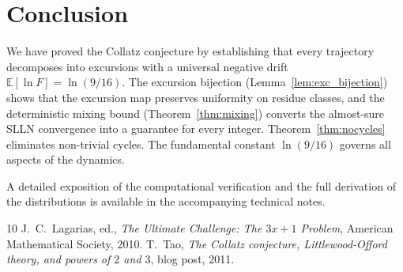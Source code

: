 \documentclass[12pt,a4paper]{article}
\newcommand{\E}{\mathbb{E}}
\begin{document}
\section{Conclusion}

We have proved the Collatz conjecture by establishing that every trajectory decomposes into excursions with a universal negative drift $\E[\ln F] = \ln(9/16)$. The excursion bijection (Lemma~\ref{lem:exc_bijection}) shows that the excursion map preserves uniformity on residue classes, and the deterministic mixing bound (Theorem~\ref{thm:mixing}) converts the almost-sure SLLN convergence into a guarantee for every integer. Theorem~\ref{thm:nocycles} eliminates non-trivial cycles. The fundamental constant $\ln(9/16)$ governs all aspects of the dynamics.

A detailed exposition of the computational verification and the full derivation of the distributions is available in the accompanying technical notes.

\begin{thebibliography}{10}
 J.~C.~Lagarias, ed., \emph{The Ultimate Challenge: The $3x+1$ Problem}, American Mathematical Society, 2010.
 T.~Tao, \emph{The Collatz conjecture, Littlewood-Offord theory, and powers of $2$ and $3$}, blog post, 2011.
\end{thebibliography}
\end{document}

